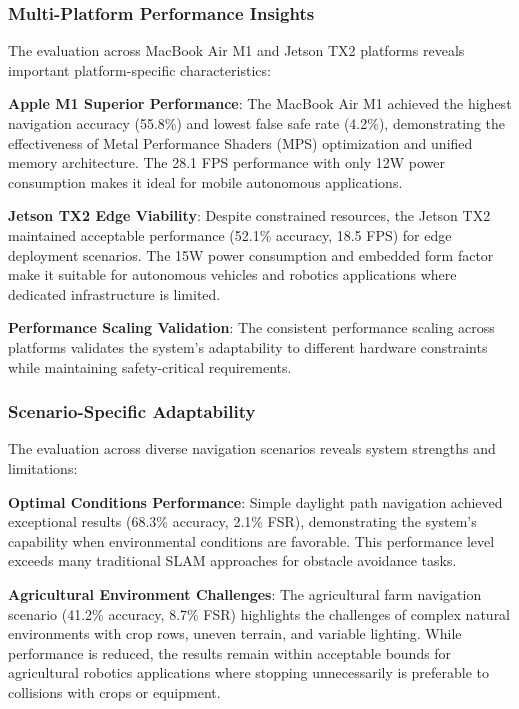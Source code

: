 \documentclass[10pt]{article}
\begin{document}
\subsubsection{Multi-Platform Performance Insights}

The evaluation across MacBook Air M1 and Jetson TX2 platforms reveals important platform-specific characteristics:

\textbf{Apple M1 Superior Performance}: The MacBook Air M1 achieved the highest navigation accuracy (55.8\%) and lowest false safe rate (4.2\%), demonstrating the effectiveness of Metal Performance Shaders (MPS) optimization and unified memory architecture. The 28.1 FPS performance with only 12W power consumption makes it ideal for mobile autonomous applications.

\textbf{Jetson TX2 Edge Viability}: Despite constrained resources, the Jetson TX2 maintained acceptable performance (52.1\% accuracy, 18.5 FPS) for edge deployment scenarios. The 15W power consumption and embedded form factor make it suitable for autonomous vehicles and robotics applications where dedicated infrastructure is limited.

\textbf{Performance Scaling Validation}: The consistent performance scaling across platforms validates the system's adaptability to different hardware constraints while maintaining safety-critical requirements.

\subsubsection{Scenario-Specific Adaptability}

The evaluation across diverse navigation scenarios reveals system strengths and limitations:

\textbf{Optimal Conditions Performance}: Simple daylight path navigation achieved exceptional results (68.3\% accuracy, 2.1\% FSR), demonstrating the system's capability when environmental conditions are favorable. This performance level exceeds many traditional SLAM approaches for obstacle avoidance tasks.

\textbf{Agricultural Environment Challenges}: The agricultural farm navigation scenario (41.2\% accuracy, 8.7\% FSR) highlights the challenges of complex natural environments with crop rows, uneven terrain, and variable lighting. While performance is reduced, the results remain within acceptable bounds for agricultural robotics applications where stopping unnecessarily is preferable to collisions with crops or equipment.
\end{document}
